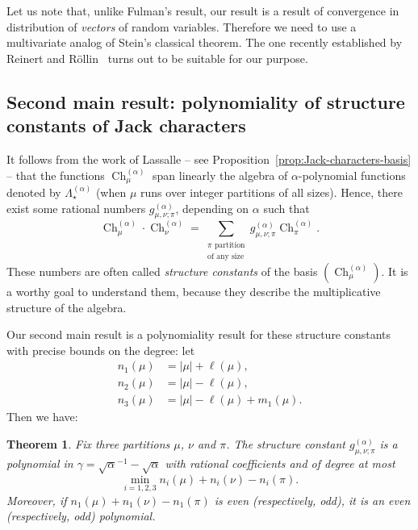 \documentclass[11pt]{amsart}
\theoremstyle{plain}
\newtheorem{theorem}[lemma]{Theorem}
\theoremstyle{remark}
\newcommand{\Pola}{\Lambda_\star^{(\alpha)}}
\DeclareMathOperator{\Ch}{Ch}
\begin{document}
Let us note that, unlike Fulman's result, our result is a result
of convergence in distribution of {\em vectors} of random variables.
Therefore we need to use a multivariate analog of Stein's classical theorem.
The one recently established by
Reinert and R{\"o}llin~\cite{ReinertRollin2009}
turns out to be suitable for our purpose.\medskip


\subsection{Second main result: polynomiality of structure constants of Jack characters}
\label{subsect:Second_Main_Result}
It follows from the work of Lassalle -- see Proposition~\ref{prop:Jack-characters-basis} --
that the functions $\Ch_{\mu}^{(\alpha)}$ span linearly the algebra of $\alpha$-polynomial functions
denoted by $\Pola$
(when $\mu$ runs over integer partitions of all sizes).
Hence, there exist some rational numbers $g^{(\alpha)}_{\mu,\nu;\pi}$,
depending on $\alpha$ such that
\begin{equation}\label{eq:definition-structure-constants}
    \Ch^{(\alpha)}_\mu \cdot \Ch^{(\alpha)}_\nu =\sum_{\substack{\pi \text{ partition} \\ \text{of any size}}} 
    g^{(\alpha)}_{\mu,\nu;\pi} \Ch^{(\alpha)}_\pi.
\end{equation}
These numbers are often called {\em structure constants} 
of the basis $(\Ch_{\mu}^{(\alpha)})$.
It is a worthy goal to understand them, because they describe
the multiplicative structure of the algebra.

Our second main result is a polynomiality result
for these structure constants with precise bounds on the degree:
let
\begin{align*}
    n_1(\mu) &= |\mu|+\ell(\mu), \\
    n_2(\mu) &= |\mu|-\ell(\mu), \\
    n_3(\mu) &= |\mu|-\ell(\mu)+m_1(\mu).
\end{align*}
Then we have:
\begin{theorem}
\label{theo:struct-const}
    Fix three partitions $\mu$, $\nu$ and $\pi$.
    The structure constant $g^{(\alpha)}_{\mu,\nu;\pi}$ is a polynomial in 
    $\gamma={\sqrt{\alpha}}^{-1}-\sqrt{\alpha}$ with rational coefficients and 
    of degree at most
    \[ \min_{i=1,2,3} n_i(\mu) + n_i(\nu) - n_i(\pi). \]
    Moreover, if $n_1(\mu) + n_1(\nu) - n_1(\pi)$ is even (respectively, odd),
    it is an even (respectively, odd) polynomial.
\end{theorem}
\end{document}

